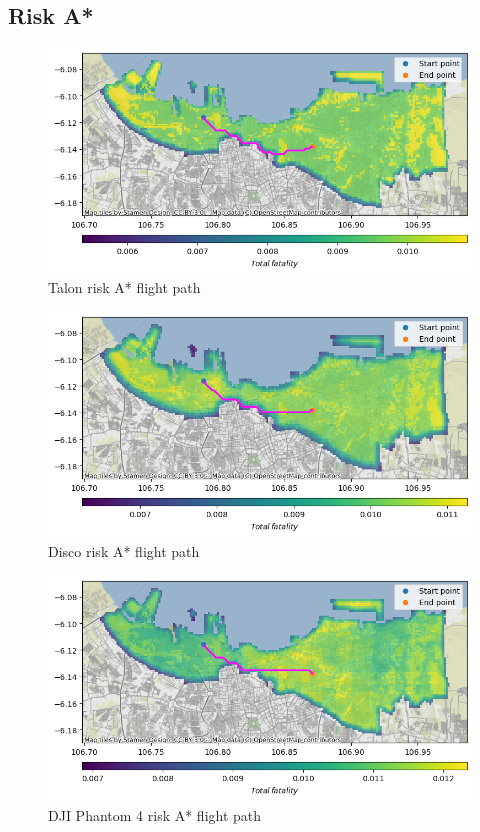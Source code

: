 \documentclass[12pt]{report}
\begin{document}
        \subsection{Risk A*}
        \begin{figure}[H]
            \centering
            \includegraphics[width=\textwidth]{Plot/talon/route with fatality.png}
            \caption{Talon risk A* flight path}
            \label{fig:talon_path}
        \end{figure}
        \begin{figure}[H]
            \centering
            \includegraphics[width=\textwidth]{Plot/parrot/route with fatality.png}
            \caption{Disco risk A* flight path}
            \label{fig:disco_path}
        \end{figure}
        \begin{figure}[H]
            \centering
            \includegraphics[width=\textwidth]{Plot/phantom4/risk with fatality.png}
            \caption{DJI Phantom 4 risk A* flight path}
            \label{fig:phantom_path}
        \end{figure}
\end{document}
